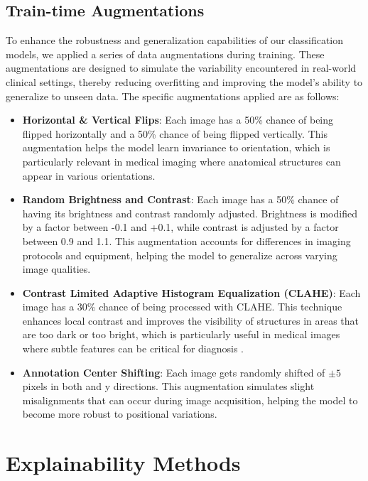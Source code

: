\subsection{Train-time Augmentations}
To enhance the robustness and generalization capabilities of our classification models, we applied a series of data augmentations during training. These augmentations are designed to simulate the variability encountered in real-world clinical settings, thereby reducing overfitting and improving the model's ability to generalize to unseen data. The specific augmentations applied are as follows:
\begin{itemize}
    \item \textbf{Horizontal \& Vertical Flips}: Each image has a 50\% chance of being flipped horizontally and a 50\% chance of being flipped vertically. This augmentation helps the model learn invariance to orientation, which is particularly relevant in medical imaging where anatomical structures can appear in various orientations.
    \item \textbf{Random Brightness and Contrast}: Each image has a 50\% chance of having its brightness and contrast randomly adjusted. Brightness is modified by a factor between -0.1 and +0.1, while contrast is adjusted by a factor between 0.9 and 1.1. This augmentation accounts for differences in imaging protocols and equipment, helping the model to generalize across varying image qualities.
    \item \textbf{Contrast Limited Adaptive Histogram Equalization (CLAHE)}: Each image has a 30\% chance of being processed with CLAHE. This technique enhances local contrast and improves the visibility of structures in areas that are too dark or too bright, which is particularly useful in medical images where subtle features can be critical for diagnosis \cite{mishra2021clahe}.
    \item \textbf{Annotation Center Shifting}: Each image gets randomly shifted of $\pm 5$ pixels in both and y directions. This augmentation simulates slight misalignments that can occur during image acquisition, helping the model to become more robust to positional variations.
\end{itemize}

\section{Explainability Methods}
\label{sec:xai_methods}

